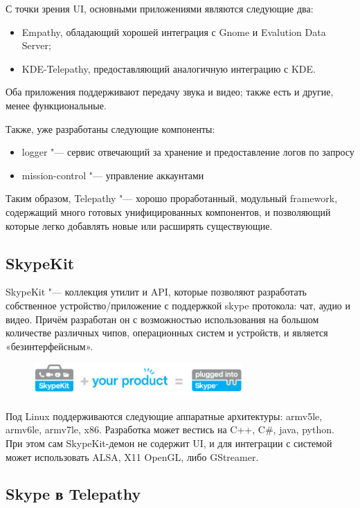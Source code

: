 \documentclass[10pt, a5paper]{article}
\begin{document}
С точки зрения UI, основными приложениями являются следующие два:
\begin{itemize}
\item Empathy, обладающий хорошей интеграция с Gnome и \linebreak Evalution Data Server;
\item KDE-Telepathy, предоставляющий аналогичную интеграцию с KDE.
\end{itemize}

Оба приложения поддерживают передачу звука и видео; также есть и другие, менее функциональные.

Также, уже разработаны следующие компоненты:
\begin{itemize}
\item logger "--- сервис отвечающий за хранение и предоставление логов по запросу
\item mission-control "--- управление аккаунтами
\end{itemize}

Таким образом, Telepathy "--- хорошо проработанный, модульный framework, содержащий много готовых унифицированных компонентов, и позволяющий которые легко добавлять новые или расширять существующие.

\subsection*{SkypeKit}
SkypeKit "--- коллекция утилит и API, которые позволяют разработать собственное устройство/приложение с поддержкой skype протокола: чат, аудио и видео. Причём разработан он с возможностью использования на большом количестве различных чипов, операционных систем и устройств, и является «безинтерфейсным».
\begin{figure}[b]
  \centering
  \includegraphics[width=8cm]{101_2013_w_Melnikau_skypekit}
\end{figure}
Под Linux поддерживаются следующие аппаратные архитектуры: armv5le,
armv6le, armv7le, x86. Разработка может вестись на C++, C\#, java, python. При этом сам SkypeKit-демон не содержит UI, и для интеграции с системой может использовать ALSA, X11 OpenGL, либо GStreamer.

\subsection*{Skype в Telepathy}
\end{document}
